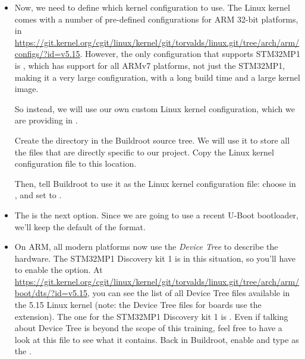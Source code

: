 \begin{itemize}
\begin{itemize}
  \item Now, we need to define which kernel configuration to use. The
    Linux kernel comes with a number of pre-defined configurations for
    ARM 32-bit platforms, in
    \url{https://git.kernel.org/cgit/linux/kernel/git/torvalds/linux.git/tree/arch/arm/configs/?id=v5.15}. However,
    the only configuration that supports STM32MP1 is
    , which has support for all ARMv7
    platforms, not just the STM32MP1, making it a very large
    configuration, with a long build time and a large kernel image.

    So instead, we will use our own custom Linux kernel configuration,
    which we are providing in
    .

    Create the directory  in the Buildroot
    source tree. We will use it to store all the files that are
    directly specific to our project. Copy the Linux kernel
    configuration file to this location.

    Then, tell Buildroot to use it as the Linux kernel configuration
    file: choose  in , and set  to
    .

  \item The  is the next option. Since we
    are going to use a recent U-Boot bootloader, we'll keep the
    default of the  format.

  \item On ARM, all modern platforms now use the {\em Device Tree} to
    describe the hardware. The STM32MP1 Discovery kit 1 is in this
    situation, so you'll have to enable the
     option. At
    \url{https://git.kernel.org/cgit/linux/kernel/git/torvalds/linux.git/tree/arch/arm/boot/dts/?id=v5.15},
    you can see the list of all Device Tree files available in the
    5.15 Linux kernel (note: the Device Tree files for boards use the
     extension). The one for the STM32MP1 Discovery kit 1
    is . Even if talking about
    Device Tree is beyond the scope of this training, feel free to
    have a look at this file to see what it contains. Back in
    Buildroot, enable  and type
     as the .


\end{itemize}
\end{itemize}
